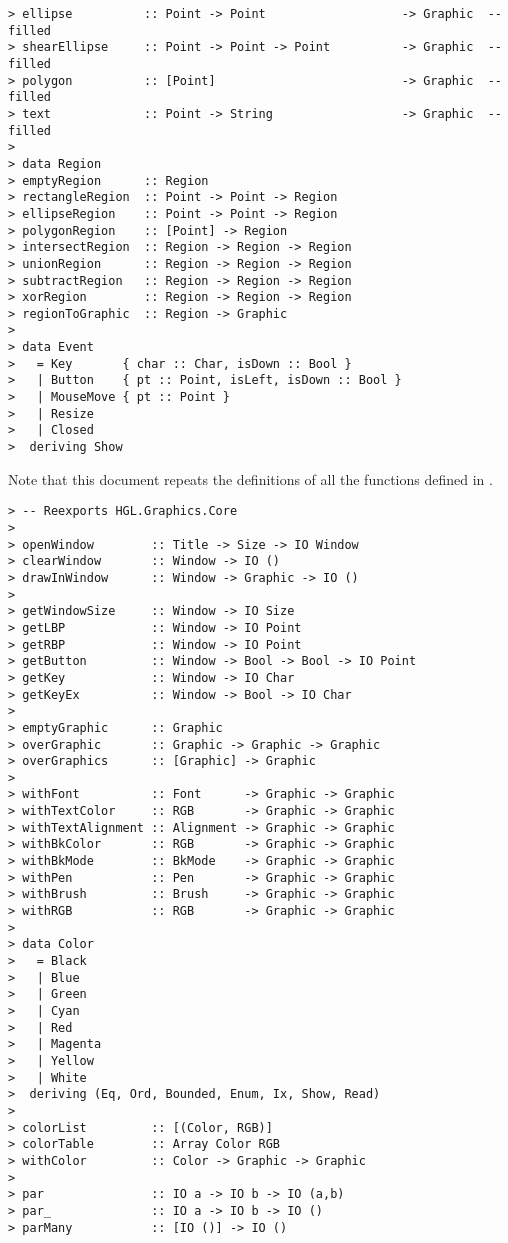 \begin{verbatim}
> ellipse          :: Point -> Point                   -> Graphic  -- filled
> shearEllipse     :: Point -> Point -> Point          -> Graphic  -- filled
> polygon          :: [Point]                          -> Graphic  -- filled
> text             :: Point -> String                  -> Graphic  -- filled
> 
> data Region
> emptyRegion      :: Region
> rectangleRegion  :: Point -> Point -> Region
> ellipseRegion    :: Point -> Point -> Region
> polygonRegion    :: [Point] -> Region
> intersectRegion  :: Region -> Region -> Region
> unionRegion      :: Region -> Region -> Region
> subtractRegion   :: Region -> Region -> Region
> xorRegion        :: Region -> Region -> Region
> regionToGraphic  :: Region -> Graphic
> 
> data Event 
>   = Key       { char :: Char, isDown :: Bool }
>   | Button    { pt :: Point, isLeft, isDown :: Bool }
>   | MouseMove { pt :: Point }
>   | Resize
>   | Closed
>  deriving Show 
\end{verbatim}



Note that this document repeats the definitions of all the functions
defined in .


\begin{verbatim}
> -- Reexports HGL.Graphics.Core
>
> openWindow        :: Title -> Size -> IO Window
> clearWindow       :: Window -> IO ()
> drawInWindow      :: Window -> Graphic -> IO ()
> 
> getWindowSize     :: Window -> IO Size
> getLBP            :: Window -> IO Point
> getRBP            :: Window -> IO Point
> getButton         :: Window -> Bool -> Bool -> IO Point
> getKey            :: Window -> IO Char
> getKeyEx          :: Window -> Bool -> IO Char
> 
> emptyGraphic      :: Graphic
> overGraphic       :: Graphic -> Graphic -> Graphic
> overGraphics      :: [Graphic] -> Graphic
> 
> withFont          :: Font      -> Graphic -> Graphic
> withTextColor     :: RGB       -> Graphic -> Graphic
> withTextAlignment :: Alignment -> Graphic -> Graphic
> withBkColor       :: RGB       -> Graphic -> Graphic
> withBkMode        :: BkMode    -> Graphic -> Graphic
> withPen           :: Pen       -> Graphic -> Graphic
> withBrush         :: Brush     -> Graphic -> Graphic
> withRGB           :: RGB       -> Graphic -> Graphic
> 
> data Color 
>   = Black
>   | Blue
>   | Green 
>   | Cyan
>   | Red 
>   | Magenta
>   | Yellow
>   | White
>  deriving (Eq, Ord, Bounded, Enum, Ix, Show, Read)
> 
> colorList         :: [(Color, RGB)]
> colorTable        :: Array Color RGB
> withColor         :: Color -> Graphic -> Graphic
> 
> par               :: IO a -> IO b -> IO (a,b)
> par_              :: IO a -> IO b -> IO ()
> parMany           :: [IO ()] -> IO ()
\end{verbatim}

